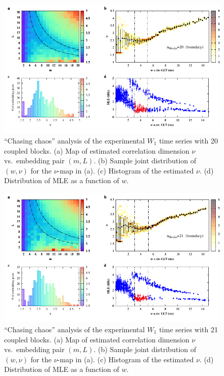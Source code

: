 \begin{appendices}
\begin{figure}[!htbp]
    \centering
    \includegraphics[width=\linewidth]{../blocks/20_blocks/2e5_points/plots/chaos_low.pdf}
    \caption{``Chasing chaos'' analysis of the experimental $W_1$ time series with 20 coupled blocks.
    (a) Map of estimated correlation dimension $\nu$ vs.\ embedding pair $(m, L)$.
    (b) Sample joint distribution of $(w,\nu)$ for the $\nu$-map in (a).
    (c) Histogram of the estimated $\nu$. (d) Distribution of MLE as a function of $w$.
    } 
\end{figure}

\begin{figure}[!htbp]
    \centering
    \includegraphics[width=\linewidth]{../blocks/21_blocks/edge/2e5_points/plots/chaos_low.pdf}
    \caption{``Chasing chaos'' analysis of the experimental $W_1$ time series with 21 coupled blocks.
    (a) Map of estimated correlation dimension $\nu$ vs.\ embedding pair $(m, L)$.
    (b) Sample joint distribution of $(w,\nu)$ for the $\nu$-map in (a).
    (c) Histogram of the estimated $\nu$. (d) Distribution of MLE as a function of $w$.
    } 
\end{figure}


\end{appendices}
